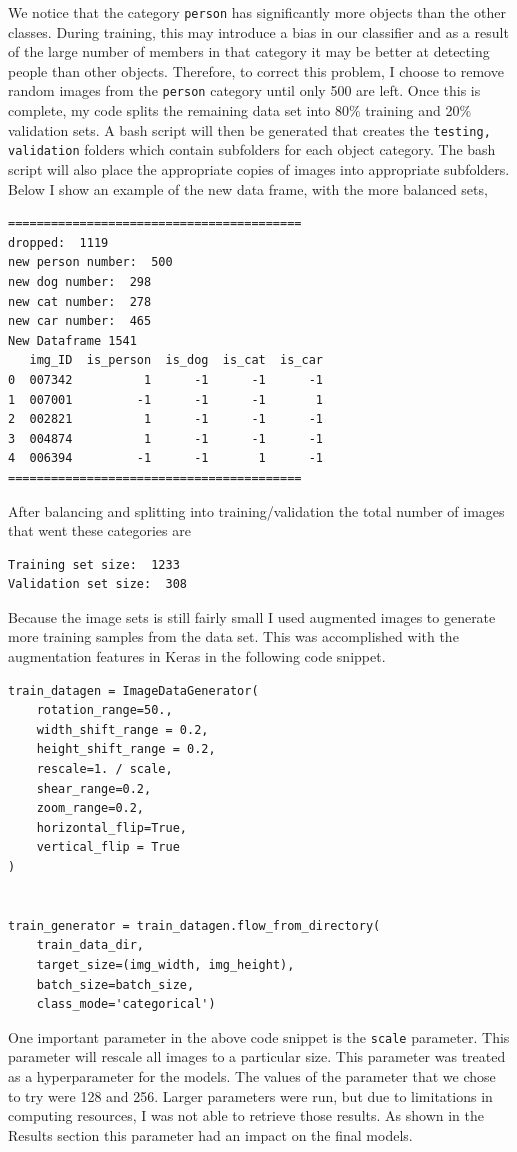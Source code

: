 \documentclass[10pt,a4paper]{article}
\begin{document}
We notice that the category \lstinline{person} has significantly more objects than the other classes. During training, this may introduce a bias in our classifier and as a result of the large number of members in that category it may be better at detecting people than other objects. Therefore, to correct this problem, I choose to remove random images from the \lstinline{person} category until only 500 are left. Once this is complete, my code splits the remaining data set into 80$\%$ training and 20$\%$ validation sets. A bash script will then be generated that creates the \lstinline{testing, validation} folders which contain subfolders for each object category. The bash script will also place the appropriate copies of images into appropriate subfolders. Below I show an example of the new data frame, with the more balanced sets,
\begin{lstlisting}
=========================================
dropped:  1119
new person number:  500
new dog number:  298
new cat number:  278
new car number:  465
New Dataframe 1541
   img_ID  is_person  is_dog  is_cat  is_car
0  007342          1      -1      -1      -1
1  007001         -1      -1      -1       1
2  002821          1      -1      -1      -1
3  004874          1      -1      -1      -1
4  006394         -1      -1       1      -1
=========================================
\end{lstlisting}
After balancing and splitting into training/validation the total number of images that went these categories are 
\begin{lstlisting}
Training set size:  1233
Validation set size:  308
\end{lstlisting}
Because the image sets is still fairly small I used augmented images to generate more training samples from the data set. This was accomplished with the augmentation features in Keras in the following code snippet.

\begin{lstlisting}
train_datagen = ImageDataGenerator(
    rotation_range=50.,
    width_shift_range = 0.2,
    height_shift_range = 0.2,
    rescale=1. / scale,
    shear_range=0.2,
    zoom_range=0.2,
    horizontal_flip=True,
    vertical_flip = True
)


train_generator = train_datagen.flow_from_directory(
    train_data_dir,
    target_size=(img_width, img_height),
    batch_size=batch_size,
    class_mode='categorical')
\end{lstlisting}


One important parameter in the above code snippet is the \lstinline{scale} parameter. This parameter will rescale all images to a particular size. This parameter was treated as a hyperparameter for the models. The values of the parameter that we chose to try were 128 and 256. Larger parameters were run, but due to limitations in computing resources, I was not able to retrieve those results. As shown in the Results section this parameter had an impact on the final models.
\end{document}
